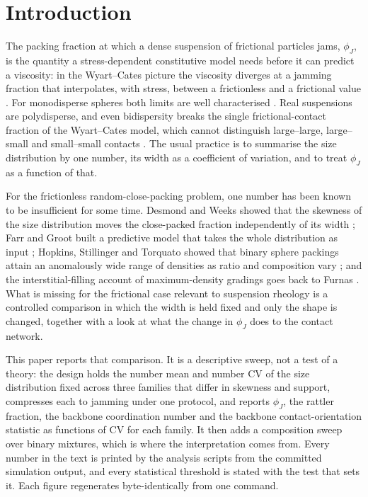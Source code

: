 \documentclass[reprint,aps,pre,amsmath,amssymb,superscriptaddress,longbibliography,nofootinbib,floatfix]{revtex4-2}
\newcommand{\phiJ}{\phi_{J}}
\newcommand{\CV}{\mathrm{CV}}
\begin{document}
\section{Introduction}

The packing fraction at which a dense suspension of frictional particles jams, $\phiJ$, is the quantity a stress-dependent constitutive model needs before it can predict a viscosity: in the Wyart--Cates picture the viscosity diverges at a jamming fraction that interpolates, with stress, between a frictionless and a frictional value \cite{wyart2014discontinuous}.
For monodisperse spheres both limits are well characterised \cite{ohern2003jamming,silbert2010jamming,vanhecke2010jamming}.
Real suspensions are polydisperse, and even bidispersity breaks the single frictional-contact fraction of the Wyart--Cates model, which cannot distinguish large--large, large--small and small--small contacts \cite{guy2020testing}.
The usual practice is to summarise the size distribution by one number, its width as a coefficient of variation, and to treat $\phiJ$ as a function of that.

For the frictionless random-close-packing problem, one number has been known to be insufficient for some time.
Desmond and Weeks showed that the skewness of the size distribution moves the close-packed fraction independently of its width \cite{desmond2014influence}; Farr and Groot built a predictive model that takes the whole distribution as input \cite{farr2009close}; Hopkins, Stillinger and Torquato showed that binary sphere packings attain an anomalously wide range of densities as ratio and composition vary \cite{hopkins2013disordered}; and the interstitial-filling account of maximum-density gradings goes back to Furnas \cite{furnas1931grading}.
What is missing for the frictional case relevant to suspension rheology is a controlled comparison in which the width is held fixed and only the shape is changed, together with a look at what the change in $\phiJ$ does to the contact network.

This paper reports that comparison.
It is a descriptive sweep, not a test of a theory: the design holds the number mean and number $\CV$ of the size distribution fixed across three families that differ in skewness and support, compresses each to jamming under one protocol, and reports $\phiJ$, the rattler fraction, the backbone coordination number and the backbone contact-orientation statistic as functions of $\CV$ for each family.
It then adds a composition sweep over binary mixtures, which is where the interpretation comes from.
Every number in the text is printed by the analysis scripts from the committed simulation output, and every statistical threshold is stated with the test that sets it.
Each figure regenerates byte-identically from one command.
\end{document}
